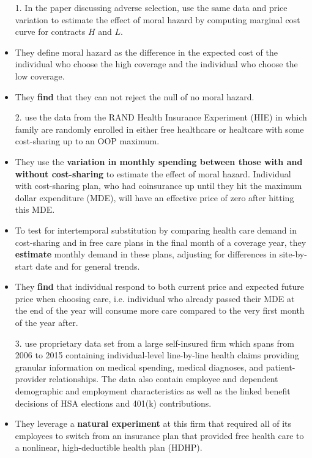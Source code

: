 \documentclass{article}
\begin{document}
\begin{itemize}
    \item[1.] In the paper discussing adverse selection, \textbf{\cite{einav2010estimating}} use the same data and price variation to estimate the effect of moral hazard by computing marginal cost curve for contracts $H$ and $L$. 
    \item They define moral hazard as the difference in the expected cost of the individual who choose the high coverage and the individual who choose the low coverage. 
    \item They \textbf{find} that they can not reject the null of no moral hazard.
    \item[2.] \textbf{\cite{lin2019intertemporal}} use the data from the RAND Health Insurance Experiment (HIE) in which family are randomly enrolled in either free healthcare or healtcare with some cost-sharing up to an OOP maximum. 
    \item They use the \textbf{variation in monthly spending between those with and without cost-sharing} to estimate the effect of moral hazard. Individual with cost-sharing plan, who had coinsurance up until they hit the maximum dollar expenditure (MDE), will have an effective price of zero after hitting this MDE. 
    \item  To test for intertemporal substitution by comparing health care demand in cost-sharing and in free care plans in the final month of a coverage year, they \textbf{estimate} monthly demand in these plans, adjusting for differences in site-by-start date and for general trends.
    \item They \textbf{find} that individual respond to both current price and expected future price when choosing care, i.e. individual who already passed their MDE at the end of the year will consume more care compared to the very first month of the year after.
    \item[3.] \textbf{\cite{brot2017does}} use proprietary data set from a large self-insured firm which spans from 2006 to 2015 containing individual-level line-by-line health claims providing granular information on medical spending, medical diagnoses, and patient-provider relationships. The data also contain employee and dependent demographic and employment characteristics as well as the linked benefit decisions of HSA elections and 401(k) contributions. 
    \item They leverage a \textbf{natural experiment} at this firm that required all of its employees to switch from an insurance plan that provided free health care to a nonlinear, high-deductible health plan (HDHP). 

\end{itemize}
\end{document}
